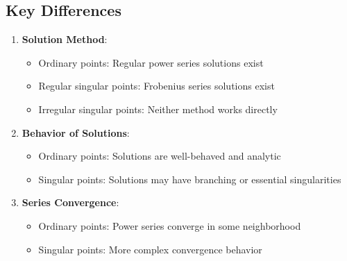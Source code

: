 \subsection{Key Differences}
\begin{enumerate}
    \item \textbf{Solution Method}:
        \begin{itemize}
            \item Ordinary points: Regular power series solutions exist
            \item Regular singular points: Frobenius series solutions exist
            \item Irregular singular points: Neither method works directly
        \end{itemize}
    \item \textbf{Behavior of Solutions}:
        \begin{itemize}
            \item Ordinary points: Solutions are well-behaved and analytic
            \item Singular points: Solutions may have branching or essential singularities
        \end{itemize}
    \item \textbf{Series Convergence}:
        \begin{itemize}
            \item Ordinary points: Power series converge in some neighborhood
            \item Singular points: More complex convergence behavior
        \end{itemize}
\end{enumerate}